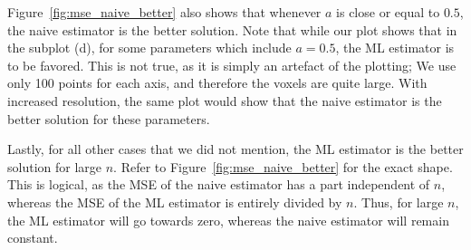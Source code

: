 Figure~\ref{fig:mse_naive_better} also shows that whenever $a$ is close or equal to $0.5$, the naive estimator is the better solution. Note that while our plot shows that in the subplot (d), for some parameters which include $a=0.5$, the ML estimator is to be favored. This is not true, as it is simply an artefact of the plotting; We use only 100 points for each axis, and therefore the voxels are quite large. With increased resolution, the same plot would show that the naive estimator is the better solution for these parameters.

Lastly, for all other cases that we did not mention, the ML estimator is the better solution for large $n$. Refer to Figure~\ref{fig:mse_naive_better} for the exact shape. This is logical, as the MSE of the naive estimator has a part independent of $n$, whereas the MSE of the ML estimator is entirely divided by $n$. Thus, for large $n$, the ML estimator will go towards zero, whereas the naive estimator will remain constant.






